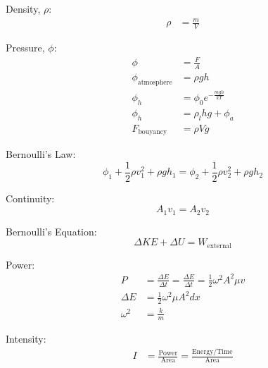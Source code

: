 \documentclass[10pt, letterpaper]{book}
\begin{document}
\begin{multicols*}{2}
        Density, $\rho$:
        \begin{align}
            \rho    & = \frac{m}{V}                             
        \end{align}

        Pressure, $\phi$:
        \begin{align}
            \phi    & = \frac{F}{A}                             \\
            \phi_{\text{atmosphere}}
                    & = \rho g h                                \\
            \phi_{h}& = \phi_{0}e^{-\frac{mgh}{kT}}             \\
            \phi_{h}& = \rho_{l}hg + \phi_{a}                   \\
            F_{\text{bouyancy}} 
                    & = \rho V g
        \end{align}

        Bernoulli's Law:
        \begin{equation}
            \phi_{1} + \frac{1}{2}\rho v_{1}^{2} + \rho gh_{1} = 
            \phi_{2} + \frac{1}{2}\rho v_{2}^{2} + \rho gh_{2}
        \end{equation}

        Continuity:
        \begin{equation}
            A_{1}v_{1} = A_{2}v_{2}
        \end{equation}

        Bernoulli's Equation:
        \begin{equation}
            \Delta KE + \Delta U = W_{\text{external}}
        \end{equation}

        Power:
        \begin{align}
            P   & = \frac{\Delta E}{\Delta t}
                = \frac{\Delta E}{\Delta t} 
                = \frac{1}{2}\omega^{2}A^{2}\mu v           \\
            \Delta E & =\frac{1}{2}\omega^{2}\mu A^{2}dx    \\
            \omega^{2} & = \frac{k}{m}                      
        \end{align}

        Intensity:
        \begin{align}
            I   & = \frac{\text{Power}}{\text{Area}}
                  = \frac{\text{Energy}/\text{Time}}{\text{Area}}
        \end{align}


\end{multicols*}
\end{document}
